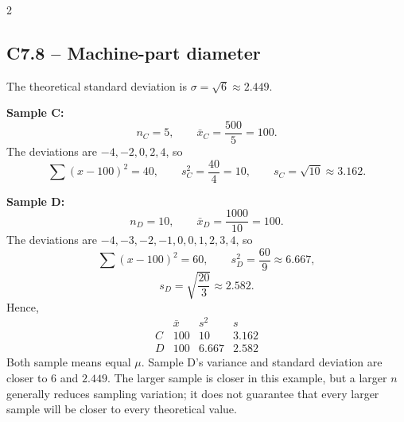 \begin{multicols}{2}

\subsection*{C7.8 -- Machine-part diameter}
\label{subsec:c7-solution-diameters}

The theoretical standard deviation is
$\sigma=\sqrt6\approx2.449$.

\textbf{Sample C:}
\[
	n_C=5,\qquad \bar{x}_C=\frac{500}{5}=100.
\]
The deviations are $-4,-2,0,2,4$, so
\[
	\sum(x-100)^2=40,\qquad
	s_C^2=\frac{40}{4}=10,\qquad s_C=\sqrt{10}\approx3.162.
\]

\textbf{Sample D:}
\[
	n_D=10,\qquad \bar{x}_D=\frac{1000}{10}=100.
\]
The deviations are $-4,-3,-2,-1,0,0,1,2,3,4$, so
\[
	\sum(x-100)^2=60,\qquad
	s_D^2=\frac{60}{9}\approx6.667,
\]
\[
	s_D=\sqrt{\frac{20}{3}}\approx2.582.
\]
Hence,
\[
\boxed{
\begin{array}{c|ccc}
	&\bar{x}&s^2&s\\ \hline
	C&100&10&3.162\\
	D&100&6.667&2.582
\end{array}}
\]
Both sample means equal $\mu$. Sample D's variance and standard deviation
are closer to $6$ and $2.449$. The larger sample is closer in this example,
but a larger $n$ generally reduces sampling variation; it does not guarantee
that every larger sample will be closer to every theoretical value.

\end{multicols}


